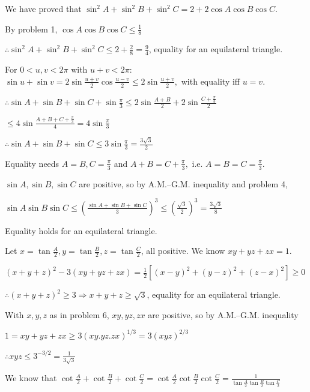 \item We have proved that $\sin^2A + \sin^2B + \sin^2C = 2 + 2\cos A\cos B\cos C$.

  By problem 1, $\cos A\cos B\cos C \leq \frac{1}{8}$

  $\therefore \sin^2A + \sin^2B + \sin^2C \leq 2 + \frac{2}{8} = \frac{9}{4}$, equality for an equilateral triangle.

\item For $0 < u, v < 2\pi$ with $u + v < 2\pi$: $\sin u + \sin v = 2\sin\frac{u + v}{2}\cos\frac{u - v}{2} \leq
  2\sin\frac{u + v}{2},$ with equality iff $u = v$.

  $\therefore \sin A + \sin B + \sin C + \sin\frac{\pi}{3} \leq 2\sin\frac{A + B}{2} + 2\sin\frac{C + \frac{\pi}{3}}{2}$

  $\leq 4\sin\frac{A + B + C + \frac{\pi}{3}}{4} = 4\sin\frac{\pi}{3}$

  $\therefore \sin A + \sin B + \sin C \leq 3\sin\frac{\pi}{3} = \frac{3\sqrt{3}}{2}$

  Equality needs $A = B, C = \frac{\pi}{3}$ and $A + B = C + \frac{\pi}{3},$ i.e. $A = B = C = \frac{\pi}{3}$.

\item $\sin A, \sin B, \sin C$ are positive, so by A.M.--G.M. inequality and problem 4,

  $\sin A\sin B\sin C \leq \left(\frac{\sin A + \sin B + \sin C}{3}\right)^3 \leq \left(\frac{\sqrt{3}}{2}\right)^3 =
  \frac{3\sqrt{3}}{8}$

  Equality holds for an equilateral triangle.

\item Let $x = \tan\frac{A}{2}, y = \tan\frac{B}{2}, z = \tan\frac{C}{2}$, all positive. We know $xy + yz + zx = 1$.

  $(x + y + z)^2 - 3(xy + yz + zx) = \frac{1}{2}[(x - y)^2 + (y - z)^2 + (z - x)^2] \geq 0$

  $\therefore (x + y + z)^2 \geq 3 \Rightarrow x + y + z \geq \sqrt{3}$, equality for an equilateral triangle.

\item With $x, y, z$ as in problem 6, $xy, yz, zx$ are positive, so by A.M.--G.M. inequality

  $1 = xy + yz + zx \geq 3(xy.yz.zx)^{1/3} = 3(xyz)^{2/3}$

  $\therefore xyz \leq 3^{-3/2} = \frac{1}{3\sqrt{3}}$

\item We know that $\cot\frac{A}{2} + \cot\frac{B}{2} + \cot\frac{C}{2} = \cot\frac{A}{2}\cot\frac{B}{2}\cot\frac{C}{2}
  = \frac{1}{\tan\frac{A}{2}\tan\frac{B}{2}\tan\frac{C}{2}}$


